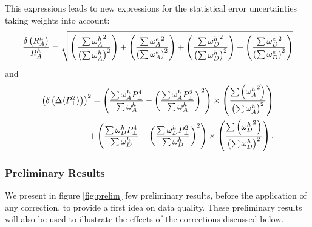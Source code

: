 This expressions leads to new expressions for the statistical error uncertainties taking weights into account: 
\begin{equation}
{\delta \left ( R_A^h \right ) \over R_A^h} = 
      \sqrt{ \left ( {\sum {\omega^h_A}^2 \over \left (\sum \omega^h_A \right )^2} \right ) 
           + \left ( {\sum {\omega^e_A}^2 \over \left (\sum \omega^e_A \right )^2} \right ) 
           + \left ( {\sum {\omega^h_D}^2 \over \left (\sum \omega^h_D \right )^2} \right ) 
           + \left ( {\sum {\omega^e_D}^2 \over \left (\sum \omega^e_D \right )^2} \right ) }
\end{equation}
 and 
\begin{equation}
\begin{split}
\left ( \delta \left ( \Delta \langle P_\perp^2 \rangle \right ) \right )^2 = 
   \left ({{\sum \omega^h_A P_\perp^4 }\over{\sum \omega^h_A}} - \left ({\sum \omega^h_A P_\perp^2 }\over{\sum \omega^h_A}\right )^2 \right ) 
         \times \left ( {\sum \left ( {\omega^h_A}^2 \right ) \over \left ( \sum \omega^h_A \right ) ^2 }\right ) \\
 + \left ({{\sum \omega^h_D P_\perp^4 }\over{\sum \omega^h_D}} - \left ({\sum \omega^h_D P_\perp^2 }\over{\sum \omega^h_D}\right )^2 \right ) 
	 \times \left ( {\sum \left ( {\omega^h_D}^2 \right ) \over \left ( \sum \omega^h_D \right ) ^2 }\right ).
\end{split}
\end{equation}

\subsubsection{Preliminary Results}
\label{prelim}

We present in figure \ref{fig:prelim} few preliminary results, before the application 
of any correction, to 
provide a first idea on data quality. These preliminary results will also be used to 
illustrate the effects of the corrections discussed below.

